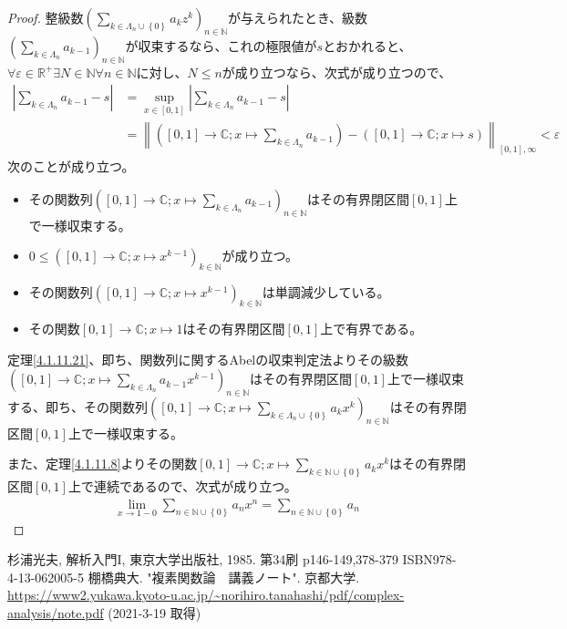 \documentclass[dvipdfmx]{jsarticle}
\begin{document}
\begin{proof}
整級数$\left( \sum_{k \in \varLambda_{n} \cup \left\{ 0 \right\}} {a_{k}z^{k}} \right)_{n \in \mathbb{N}}$が与えられたとき、級数$\left( \sum_{k \in \varLambda_{n}} a_{k - 1} \right)_{n \in \mathbb{N}}$が収束するなら、これの極限値が$s$とおかれると、$\forall\varepsilon \in \mathbb{R}^{+}\exists N \in \mathbb{N}\forall n \in \mathbb{N}$に対し、$N \leq n$が成り立つなら、次式が成り立つので、
\begin{align*}
\left| \sum_{k \in \varLambda_{n}} a_{k - 1} - s \right| &= \sup_{x \in [ 0,1]}\left| \sum_{k \in \varLambda_{n}} a_{k - 1} - s \right|\\
&= \left\| \left( [ 0,1] \rightarrow \mathbb{C};x \mapsto \sum_{k \in \varLambda_{n}} a_{k - 1} \right) - \left( [ 0,1] \rightarrow \mathbb{C};x \mapsto s \right) \right\|_{[ 0,1],\infty} < \varepsilon
\end{align*}
次のことが成り立つ。
\begin{itemize}
\item
  その関数列$\left( [ 0,1] \rightarrow \mathbb{C};x \mapsto \sum_{k \in \varLambda_{n}} a_{k - 1} \right)_{n \in \mathbb{N}}$はその有界閉区間$[ 0,1]$上で一様収束する。
\item
  $0 \leq \left( [ 0,1] \rightarrow \mathbb{C};x \mapsto x^{k - 1} \right)_{k \in \mathbb{N}}$が成り立つ。
\item
  その関数列$\left( [ 0,1] \rightarrow \mathbb{C};x \mapsto x^{k - 1} \right)_{k \in \mathbb{N}}$は単調減少している。
\item
  その関数$[ 0,1] \rightarrow \mathbb{C};x \mapsto 1$はその有界閉区間$[ 0,1]$上で有界である。
\end{itemize}
定理\ref{4.1.11.21}、即ち、関数列に関するAbelの収束判定法よりその級数$\left( [ 0,1] \rightarrow \mathbb{C};x \mapsto \sum_{k \in \varLambda_{n}} {a_{k - 1}x^{k - 1}} \right)_{n \in \mathbb{N}}$はその有界閉区間$[ 0,1]$上で一様収束する、即ち、その関数列$\left( [ 0,1] \rightarrow \mathbb{C};x \mapsto \sum_{k \in \varLambda_{n} \cup \left\{ 0 \right\}} {a_{k}x^{k}} \right)_{n \in \mathbb{N}}$はその有界閉区間$[ 0,1]$上で一様収束する。\par
また、定理\ref{4.1.11.8}よりその関数$[ 0,1] \rightarrow \mathbb{C};x \mapsto \sum_{k \in \mathbb{N} \cup \left\{ 0 \right\}} {a_{k}x^{k}}$はその有界閉区間$[ 0,1]$上で連続であるので、次式が成り立つ。
\begin{align*}
\lim_{x \rightarrow 1 - 0}{\sum_{n \in \mathbb{N} \cup \left\{ 0 \right\}} {a_{n}x^{n}}} = \sum_{n \in \mathbb{N} \cup \left\{ 0 \right\}} a_{n}
\end{align*}
\end{proof}
\begin{thebibliography}{50}
  杉浦光夫, 解析入門I, 東京大学出版社, 1985. 第34刷 p146-149,378-379 ISBN978-4-13-062005-5
  棚橋典大. "複素関数論　講義ノート". 京都大学. \url{https://www2.yukawa.kyoto-u.ac.jp/~norihiro.tanahashi/pdf/complex-analysis/note.pdf} (2021-3-19 取得)
\end{thebibliography}
\end{document}
